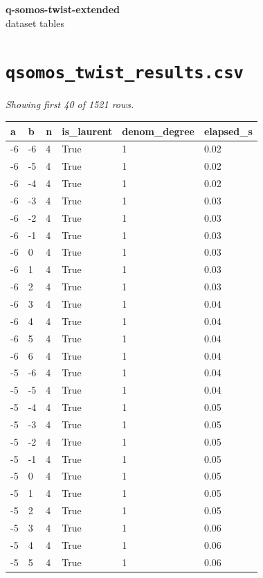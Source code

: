 \documentclass[10pt]{article}
\begin{document}
\begin{center}\Large\textbf{q-somos-twist-extended} \\ \normalsize dataset tables\end{center}
\vspace{1em}
\section*{\texttt{qsomos\_twist\_results.csv}}
\noindent\textit{Showing first 40 of 1521 rows.}\par\medskip
{\footnotesize
\begin{longtable}{@{}llllll@{}}
\toprule
\textbf{a} & \textbf{b} & \textbf{n} & \textbf{is\_laurent} & \textbf{denom\_degree} & \textbf{elapsed\_s} \\
\midrule\endhead
-6 & -6 & 4 & True & 1 & 0.02 \\
-6 & -5 & 4 & True & 1 & 0.02 \\
-6 & -4 & 4 & True & 1 & 0.02 \\
-6 & -3 & 4 & True & 1 & 0.03 \\
-6 & -2 & 4 & True & 1 & 0.03 \\
-6 & -1 & 4 & True & 1 & 0.03 \\
-6 & 0 & 4 & True & 1 & 0.03 \\
-6 & 1 & 4 & True & 1 & 0.03 \\
-6 & 2 & 4 & True & 1 & 0.03 \\
-6 & 3 & 4 & True & 1 & 0.04 \\
-6 & 4 & 4 & True & 1 & 0.04 \\
-6 & 5 & 4 & True & 1 & 0.04 \\
-6 & 6 & 4 & True & 1 & 0.04 \\
-5 & -6 & 4 & True & 1 & 0.04 \\
-5 & -5 & 4 & True & 1 & 0.04 \\
-5 & -4 & 4 & True & 1 & 0.05 \\
-5 & -3 & 4 & True & 1 & 0.05 \\
-5 & -2 & 4 & True & 1 & 0.05 \\
-5 & -1 & 4 & True & 1 & 0.05 \\
-5 & 0 & 4 & True & 1 & 0.05 \\
-5 & 1 & 4 & True & 1 & 0.05 \\
-5 & 2 & 4 & True & 1 & 0.05 \\
-5 & 3 & 4 & True & 1 & 0.06 \\
-5 & 4 & 4 & True & 1 & 0.06 \\
-5 & 5 & 4 & True & 1 & 0.06 \\

\end{longtable}}
\end{document}
